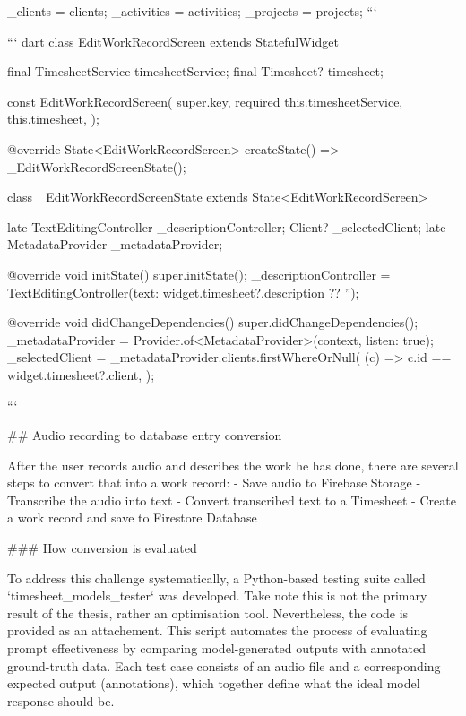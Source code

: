 \documentclass[
  digital,     %
  oneside,     %
  nosansbold,  %
  nocolorbold, %
  lof,         %
  lot,         %
]{fithesis4}
\begin{document}
\begin{markdown}
{{{      _clients = clients;
      _activities = activities;
      _projects = projects;
    }
  }
}
```

``` dart
class EditWorkRecordScreen extends StatefulWidget {
  final TimesheetService timesheetService;
  final Timesheet? timesheet;

  const EditWorkRecordScreen({
    super.key,
    required this.timesheetService,
    this.timesheet,
  });

  @override
  State<EditWorkRecordScreen> createState() => _EditWorkRecordScreenState();
}

class _EditWorkRecordScreenState extends State<EditWorkRecordScreen> {
  late TextEditingController _descriptionController;
  Client? _selectedClient;
  late MetadataProvider _metadataProvider;

  @override
  void initState() {
    super.initState();
    _descriptionController =
        TextEditingController(text: widget.timesheet?.description ?? '');
  }

  @override
  void didChangeDependencies() {
    super.didChangeDependencies();
    _metadataProvider = Provider.of<MetadataProvider>(context, listen: true);
    _selectedClient = _metadataProvider.clients.firstWhereOrNull(
      (c) => c.id == widget.timesheet?.client,
    );
  }
}
```

## Audio recording to database entry conversion

After the user records audio and describes the work he has done, there are several steps to convert that into a work record:
- Save audio to Firebase Storage
- Transcribe the audio into text
- Convert transcribed text to a Timesheet
- Create a work record and save to Firestore Database

### How conversion is evaluated

To address this challenge systematically, a Python-based testing suite called `timesheet_models_tester` was developed. Take note this is not the primary result of the thesis, rather an optimisation tool. Nevertheless, the code is provided as an attachement. This script automates the process of evaluating prompt effectiveness by comparing model-generated outputs with annotated ground-truth data. Each test case consists of an audio file and a corresponding expected output (annotations), which together define what the ideal model response should be.


\end{markdown}
\end{document}
